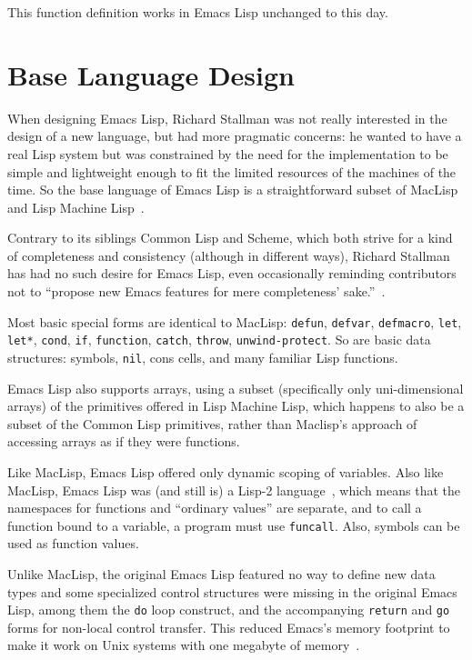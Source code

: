 \documentclass[format=acmsmall,screen]{acmart}
\newcommand \Elisp {Emacs Lisp}
\begin{document}
This function definition works in \Elisp{} unchanged to this day.

\section{Base Language Design}
\label{sec:base-language-design}

When designing \Elisp{}, Richard Stallman was not really interested in the
design of a new language, but had more pragmatic concerns: he
wanted to have a real Lisp system but was constrained by the need for the
implementation to be simple and lightweight enough to fit the limited
resources of the machines of the time.  So the base language of \Elisp{} is
a straightforward subset of MacLisp~\cite{Moon1974,Pitman1983} and Lisp
Machine Lisp~\cite{WeinrebMoon1981}.

Contrary to its siblings Common Lisp and Scheme, which both strive for
a kind of completeness and consistency (although in different ways),
Richard Stallman has
had no such desire for \Elisp, even occasionally reminding contributors
not to ``propose new Emacs features for mere completeness'
sake.''~\cite{RMS-completeness}.

Most basic special forms are identical to MacLisp: \texttt{defun},
\texttt{defvar}, \texttt{defmacro}, \texttt{let}, \texttt{let*},
\texttt{cond}, \texttt{if}, \texttt{function}, \texttt{catch}, \texttt{throw},
\texttt{unwind-protect}.  So are basic data structures: symbols,
\texttt{nil}, cons cells, and many familiar Lisp functions.

\Elisp{} also supports arrays, using a subset (specifically only uni-dimensional
arrays) of the primitives offered in Lisp Machine Lisp, which happens to
also be a subset of the Common Lisp primitives, rather than Maclisp's
approach of accessing arrays as if they were functions.


Like MacLisp, \Elisp{} offered only
dynamic scoping of variables.  Also like MacLisp, \Elisp{} was (and still is) a Lisp-2
language~\cite{SteeleGabriel1993}, which means that the namespaces for
functions and ``ordinary values'' are separate, and to call a function bound
to a variable, a program must use \texttt{funcall}.  Also, symbols can be
used as function values.

Unlike MacLisp, the original \Elisp{} featured no way to define new
data types and
some specialized control structures were missing in the original
\Elisp{}, among them the \texttt{do} loop construct, and the
accompanying \texttt{return} and \texttt{go} forms for non-local
control transfer.  This reduced Emacs's memory footprint
to make it work on Unix systems with one megabyte of memory~\cite{Stallman2018-personal}.
\end{document}
